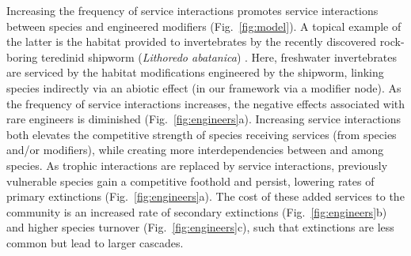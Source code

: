 \documentclass[twocolumn,preprintnumbers,amsmath,amssymb,superscriptaddress,linenumbers]{revtex4-1}
\begin{document}
\begin{bibunit}
Increasing the frequency of service interactions promotes service interactions between species and engineered modifiers (Fig.\ \ref{fig:model}).
A topical example of the latter is the habitat provided to invertebrates by the recently discovered rock-boring teredinid shipworm (\emph{Lithoredo abatanica}) \cite{Shipway2019}.
Here, freshwater invertebrates are serviced by the habitat modifications engineered by the shipworm, linking species indirectly via an abiotic effect (in our framework via a modifier node).
As the frequency of service interactions increases, the negative effects associated with rare engineers is diminished (Fig.\ \ref{fig:engineers}a).
Increasing service interactions both elevates the competitive strength of species receiving services (from species and/or modifiers), while creating more interdependencies between and among species.
As trophic interactions are replaced by service interactions, previously vulnerable species gain a competitive foothold and persist, lowering rates of primary extinctions (Fig.\ \ref{fig:engineers}a). %
The cost of these added services to the community is an increased rate of secondary extinctions (Fig.\ \ref{fig:engineers}b) and higher species turnover (Fig.\ \ref{fig:engineers}c), such that extinctions are less common but lead to larger cascades.





\end{bibunit}
\end{document}
